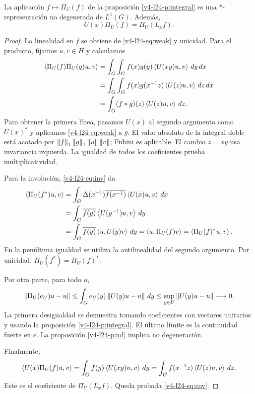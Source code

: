 \begin{teorema}\label{v4-l24-t:direct}
La aplicación $f\mapsto\Pi_U(f)$ de la proposición \ref{v4-l24-p:integral} es una $*$-representación no degenerada de $L^1(G)$. Además,
\begin{equation}\label{v4-l24-eq:cov}
U(x)\Pi_U(f)=\Pi_U(L_xf).
\end{equation}
\end{teorema}
\begin{proof}
La linealidad en $f$ se obtiene de \eqref{v4-l24-eq:weak} y unicidad. Para el producto, fijamos $u,v\in H$ y calculamos
\begin{align*}
\left\langle\Pi_U(f)\Pi_U(g)u,v\right\rangle
&=\int_G\int_G f(x)g(y)\left\langle U(xy)u,v\right\rangle\,dy\,dx\\
&=\int_G\int_G f(x)g(x^{-1}z)\left\langle U(z)u,v\right\rangle\,dz\,dx\\
&=\int_G(f*g)(z)\left\langle U(z)u,v\right\rangle\,dz.
\end{align*}
Para obtener la primera línea, pasamos $U(x)$ al segundo argumento como $U(x)^*$ y aplicamos \eqref{v4-l24-eq:weak} a $g$. El valor absoluto de la integral doble está acotado por $\left\lVert f\right\rVert_1\left\lVert g\right\rVert_1\left\lVert u\right\rVert\left\lVert v\right\rVert$; Fubini es aplicable. El cambio $z=xy$ usa invariancia izquierda. La igualdad de todos los coeficientes prueba multiplicatividad.

Para la involución, \eqref{v4-l24-eq:inv} da
\begin{align*}
\left\langle\Pi_U(f^*)u,v\right\rangle
&=\int_G\Delta(x^{-1})\overline{f(x^{-1})}\left\langle U(x)u,v\right\rangle\,dx\\
&=\int_G\overline{f(y)}\left\langle U(y^{-1})u,v\right\rangle\,dy\\
&=\int_G\overline{f(y)}\left\langle u,U(y)v\right\rangle\,dy
=\left\langle u,\Pi_U(f)v\right\rangle
=\left\langle\Pi_U(f)^*u,v\right\rangle.
\end{align*}
En la penúltima igualdad se utiliza la antilinealidad del segundo argumento. Por unicidad, $\Pi_U(f^*)=\Pi_U(f)^*$.

Por otra parte, para todo $u$,
\begin{equation}\label{v4-l24-eq:strongapprox}
\left\lVert\Pi_U(e_U)u-u\right\rVert
\leq\int_G e_U(y)\left\lVert U(y)u-u\right\rVert\,dy
\leq\sup_{y\in U}\left\lVert U(y)u-u\right\rVert\longrightarrow0.
\end{equation}
La primera desigualdad se demuestra tomando coeficientes con vectores unitarios y usando la proposición \ref{v4-l24-p:integral}. El último límite es la continuidad fuerte en $e$. La proposición \ref{v4-l24-p:nd} implica no degeneración.

Finalmente,
\[
\left\langle U(x)\Pi_U(f)u,v\right\rangle
=\int_G f(y)\left\langle U(xy)u,v\right\rangle\,dy
=\int_G f(x^{-1}z)\left\langle U(z)u,v\right\rangle\,dz.
\]
Este es el coeficiente de $\Pi_U(L_xf)$. Queda probada \eqref{v4-l24-eq:cov}.
\end{proof}

